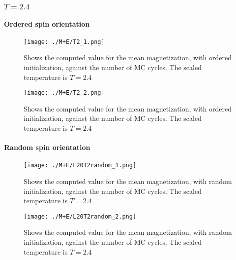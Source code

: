 \documentclass[../main.tex]{subfiles}
\begin{document}
\subsubsection*{$T=2.4$}
\paragraph*{Ordered spin orientation}

\begin{figure}[!h]
  \texttt{[image: ./M+E/T2\_1.png]}
  \caption{Shows the computed value for the mean magnetization, with ordered initialization, against the number of MC cycles. The scaled temperature is $T=2.4$}
  \label{fig:results-MCplot}
\end{figure}
\FloatBarrier
\begin{figure}[!h]
  \texttt{[image: ./M+E/T2\_2.png]}
  \caption{Shows the computed value for the mean magnetization, with ordered initialization, against the number of MC cycles. The scaled temperature is $T=2.4$}
  \label{fig:results-MCplot}
\end{figure}
\FloatBarrier

\paragraph*{Random spin orientation}

\begin{figure}[!h]
  \texttt{[image: ./M+E/L20T2random\_1.png]}
  \caption{Shows the computed value for the mean magnetization, with random initialization, against the number of MC cycles. The scaled temperature is $T=2.4$}
  \label{fig:results-MCplot}
\end{figure}
\FloatBarrier
\begin{figure}[!h]
  \texttt{[image: ./M+E/L20T2random\_2.png]}
  \caption{Shows the computed value for the mean magnetization, with random initialization, against the number of MC cycles. The scaled temperature is $T=2.4$}
  \label{fig:results-MCplot}
\end{figure}
\FloatBarrier







\end{document}
